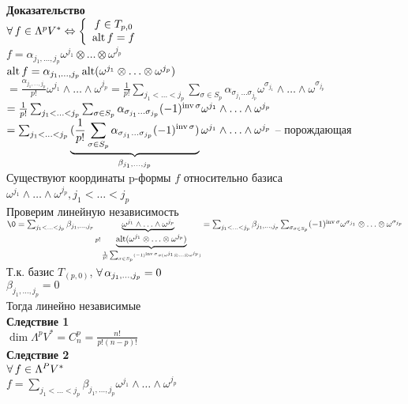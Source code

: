 \documentclass[12pt]{article}
\begin{document}
\textbf{Доказательство}\\
$\fall f \in \Lambda^p V^* \LRto \left\{\begin{array}{cc}
    f\in T_{p,0}\\
    \alt f = f
\end{array}\right.$\\
$f = \alpha_{j_1,\ldots,j_p}\omega^{j_1}\otimes \ldots \otimes \omega^{j_p}$\\
$\alt f = \alpha_{j_1,\ldots,j_p} \alt(\omega^{j_1}\otimes \ldots \otimes \omega^{j_p})$\\
$ = \frac{\alpha_{j_1,\ldots,j_p}}{p!}\omega^{j_1}\land \ldots \land \omega^{j_p} = \frac1{p!}\sum_{j_1<\ldots<j_p} \sum_{\sigma \in S_p} \alpha_{\sigma_{j_1}\ldots \sigma_{j_p}}\omega^{\sigma_{j_1}}\land \ldots \land \omega^{\sigma_{j_p}}$\\
$ = \frac1{p!}\sum_{j_1<\ldots<j_p} \sum_{\sigma \in S_p} \alpha_{\sigma_{j_1}\ldots \sigma_{j_p}}(-1)^{\inv\sigma}\omega^{j_1}\land \ldots \land \omega^{j_p}$\\
$ = \sum_{j_1<\ldots<j_p} \ub{\beta_{j_1,\ldots,j_p}}{(\frac1{p!}\sum_{\sigma \in S_p} \alpha_{\sigma_{j_1}\ldots \sigma_{j_p}}(-1)^{\inv\sigma})}\omega^{j_1}\land \ldots \land \omega^{j_p}$ -- порождающая\\
Существуют координаты p-формы $f$ относительно базиса $\omega^{j_1}\land \ldots \land \omega^{j_p}, j_1<\ldots<j_p$\\
Проверим линейную независимость\\
$\0 = \sum_{j_1<\ldots<j_p}\beta_{j_1,\ldots,j_p}\ub{p!\ub{\frac1{p!}\sum_{\sigma\in S_p}(-1)^{\inv \sigma}\sigma(\omega^{j_1}\otimes\ldots\otimes\omega^{j_p})}{\alt(\omega^{j_1}\otimes \ldots\otimes\omega^{j_p})}}{\omega^{j_1}\land\ldots\land\omega^{j_p}} = \sum_{j_1<\ldots<j_p} \beta_{j_1,\ldots,j_p}\sum_{\sigma_{\sigma\in S_p}}(-1)^{\inv \sigma} \omega^{\sigma_{j_1}} \otimes \ldots \otimes \omega^{\sigma_{j_p}}$\\
Т.к. базис $T_{(p,0)}$, $\fall \alpha_{j_1,\ldots,j_p} = 0$\\
$\beta_{j_1,\ldots,j_p} = 0$\\
Тогда линейно независимые\\
\textbf{Следствие 1}\\
$\dim \Lambda^pV^* = C_n^p = \frac{n!}{p!(n-p)!}$\\
\textbf{Следствие 2}\\
$\fall f \in \Lambda^P V^*$\\
$f = \sum_{j_1<\ldots<j_p} \beta_{j_1,\ldots,j_p} \omega^{j_1}\land \ldots\land \omega^{j_p}$\\
\end{document}
